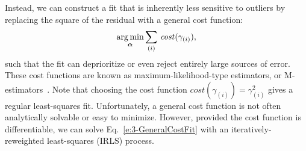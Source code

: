 Instead, we can construct a fit that is inherently less sensitive to outliers by replacing the square of the residual with a general cost function:
\begin{equation}
  \operatorname*{arg\,min}_{\bm{\alpha}} \sum\limits_{(i)}\,\mathit{cost}(\gamma_{(i)}),\label{e:3-GeneralCostFit}
\end{equation}
such that the fit can deprioritize or even reject entirely large sources of error.
These cost functions are known as maximum-likelihood-type estimators, or M-estimators~\cite{RN269}.
Note that choosing the cost function $\mathit{cost}(\gamma_{(i)}) = \gamma_{(i)}^2$ gives a regular least-squares fit.
Unfortunately, a general cost function is not often analytically solvable or easy to minimize.
However, provided the cost function is differentiable, we can solve Eq.~\ref{e:3-GeneralCostFit} with an iteratively-reweighted least-squares (IRLS) process.


